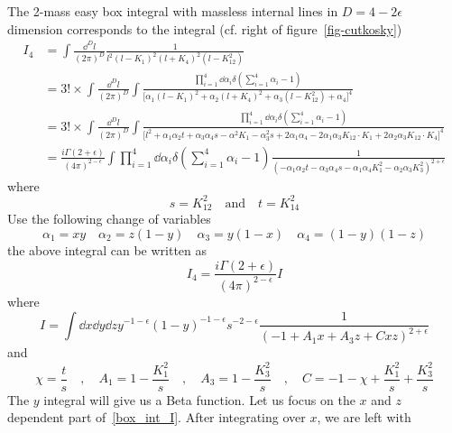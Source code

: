 The 2-mass easy box integral with massless internal lines in $D=4-2\epsilon$ dimension corresponds to the integral (cf. right of figure~\ref{fig-cutkosky})
\begin{equation*}
\begin{split}
I_4 & = \int\frac{\dd^D l }{(2\pi)^D}\frac{1}{ l^2(l-K_1)^2(l+K_4)^2 (l-K_{12}^2)}
\\
&=
3!\times\int\frac{\dd^D l }{(2\pi)^D}
\int
\frac{\prod_{i=1}^4\dd\alpha_i \delta(\sum_{i=1}^4\alpha_i -1)}{\big[\alpha_1(l-K_1)^2 + \alpha_2(l+K_4)^2 + \alpha_3 (l-K_{12}^2) + \alpha_4\big]^4}
\\
&=
3!\times\int\frac{\dd^D l }{(2\pi)^D}
\int
\frac{\prod_{i=1}^4\dd\alpha_i \delta(\sum_{i=1}^4\alpha_i -1)}{\big[l^2 + \alpha_1\alpha_2 t + \alpha_3\alpha_4 s
-\alpha^2 K_1 - \alpha_3^2s + 2\alpha_1\alpha_4 - 2\alpha_1\alpha_3K_{12}\cdot K_1 + 2\alpha_2\alpha_3 K_{12}\cdot K_4
\big]^4}
\\
&= \frac{i\Gamma(2+\epsilon)}{(4\pi)^{2-\epsilon}}\int\prod_{i=1}^4\dd\alpha_i \delta(\sum_{i=1}^4\alpha_i -1)\frac{1}{(-\alpha_1\alpha_2 t - \alpha_3\alpha_4 s 
-\alpha_1\alpha_4 K_1^2 - \alpha_2\alpha_3 K_{3}^2)^{2+\epsilon}}
\end{split}
\end{equation*}
where
\begin{equation*}
s=K_{12}^2 \quad\mathrm{and}\quad t=K_{14}^2
\end{equation*}
Use the following change of variables
\begin{equation*}
\alpha_1 = xy \quad
\alpha_2 = z(1-y)\quad
\alpha_3 = y(1-x)\quad
\alpha_4 = (1-y)(1-z)
\end{equation*}
the above integral can be written as
\begin{equation*}
I_4 = \frac{i\Gamma(2+\epsilon)}{(4\pi)^{2-\epsilon}} I
\end{equation*}
where
\begin{equation}\label{box_int_I}
I = \int\dd x\dd y \dd z y^{-1-\epsilon}(1-y)^{-1-\epsilon}s^{-2-\epsilon}
\frac{1}{(-1 + A_1 x + A_3 z + C xz)^{2+\epsilon}}
\end{equation}
and
\begin{equation*}
\chi = \frac{t}{s}\quad, \quad
A_1 = 1 - \frac{K_1^2}{s}\quad, \quad
A_3 = 1 - \frac{K_3^2}{s} \quad,\quad
C = -1 - \chi  + \frac{K_1^2}{s} + \frac{K_3^2}{s}
\end{equation*}
The $y$ integral will give us a Beta function.
Let us focus on the $x$ and $z$ dependent part of~\cref{box_int_I}.
After integrating over $x$, we are left with 

